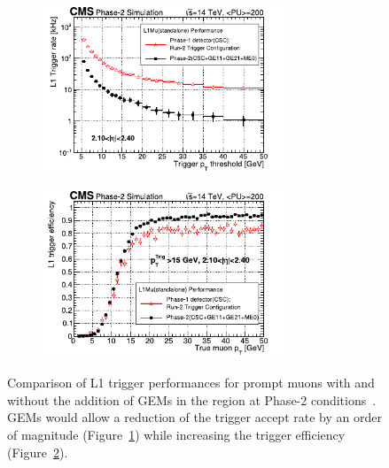 	\begin{figure}[H]
		\begin{subfigure}{0.5\linewidth}
			\centering
			\includegraphics[height=5cm]{fig/chapt3/GEM-trigger-rate.pdf}
			\caption{\label{fig:CSC-GEM-perf:A}}
		\end{subfigure}
		\begin{subfigure}{0.5\linewidth}
			\centering
			\includegraphics[height=5cm]{fig/chapt3/GEM-trigger-eff.pdf}
			\caption{\label{fig:CSC-GEM-perf:B}}
		\end{subfigure}
		\caption{\label{fig:CSC-GEM-perf} Comparison of L1 trigger performances for prompt muons with and without the addition of GEMs in the region  at Phase-2 conditions~\cite{PHASEIITP}. GEMs would allow a reduction of the trigger accept rate by an order of magnitude (Figure~\ref{fig:CSC-GEM-perf:A}) while increasing the trigger efficiency (Figure~\ref{fig:CSC-GEM-perf:B}).}
	\end{figure}
	
